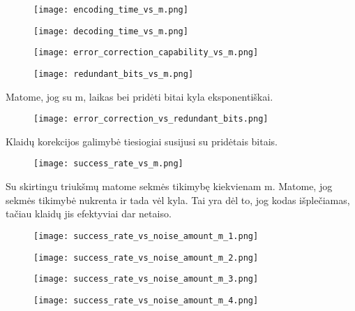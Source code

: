 \documentclass{article}
\begin{document}
\begin{figure}[H]
    \centering
    \begin{minipage}{0.45\textwidth}
        \centering
        \texttt{[image: encoding\_time\_vs\_m.png]}
    \end{minipage}
    \hfill
    \begin{minipage}{0.45\textwidth}
        \centering
        \texttt{[image: decoding\_time\_vs\_m.png]}
    \end{minipage}
\end{figure}
\begin{figure}[H]
    \centering
    \begin{minipage}{0.45\textwidth}
        \centering
        \texttt{[image: error\_correction\_capability\_vs\_m.png]}
    \end{minipage}
    \hfill
    \begin{minipage}{0.45\textwidth}
        \centering
        \texttt{[image: redundant\_bits\_vs\_m.png]}
    \end{minipage}
\end{figure}
Matome, jog su m, laikas bei pridėti bitai kyla eksponentiškai.
\begin{figure}[H]
    \centering
    \texttt{[image: error\_correction\_vs\_redundant\_bits.png]}
\end{figure}
Klaidų korekcijos galimybė tiesiogiai susijusi su pridėtais bitais.
\begin{figure}[H]
    \centering
    \texttt{[image: success\_rate\_vs\_m.png]}
\end{figure}
Su skirtingu triukšmų matome sekmės tikimybę kiekvienam m. Matome, jog sekmės tikimybė nukrenta ir tada vėl kyla. Tai yra dėl to, jog kodas išplečiamas, tačiau klaidų jis efektyviai dar netaiso.
\begin{figure}[H]
    \centering
    \begin{minipage}{0.45\textwidth}
        \centering
        \texttt{[image: success\_rate\_vs\_noise\_amount\_m\_1.png]}
    \end{minipage}
    \hfill
    \begin{minipage}{0.45\textwidth}
        \centering
        \texttt{[image: success\_rate\_vs\_noise\_amount\_m\_2.png]}
    \end{minipage}
\end{figure}
\begin{figure}[H]
    \centering
    \begin{minipage}{0.45\textwidth}
        \centering
        \texttt{[image: success\_rate\_vs\_noise\_amount\_m\_3.png]}
    \end{minipage}
    \hfill
    \begin{minipage}{0.45\textwidth}
        \centering
        \texttt{[image: success\_rate\_vs\_noise\_amount\_m\_4.png]}
    \end{minipage}
\end{figure}
\end{document}
